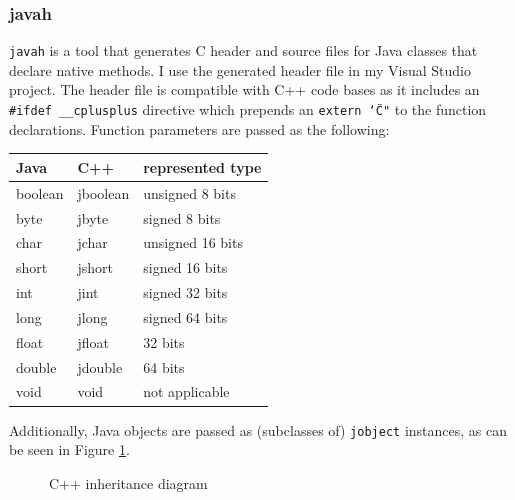 \documentclass[]{article}
\begin{document}
\subsubsection{javah}
\texttt{javah} is a tool that generates C header and source files for Java classes that declare native methods.
I use the generated header file in my Visual Studio project.
The header file is compatible with C++ code bases as it includes an \texttt{\#ifdef \_\_cplusplus} directive which prepends an \texttt{extern \char`\"C"} to the function declarations.
\cite{noauthor_jni_nodate} Function parameters are passed as the following:

\begin{center}
\begin{tabular}{|l|l|l|} \hline
  Java & C++ & represented type \\ \hline
  boolean & jboolean & unsigned 8 bits \\ 
  byte & jbyte & signed 8 bits \\ 
  char & jchar & unsigned 16 bits \\ 
  short & jshort & signed 16 bits \\ 
  int & jint & signed 32 bits \\ 
  long & jlong & signed 64 bits \\ 
  float & jfloat & 32 bits \\ 
  double & jdouble & 64 bits \\ 
  void & void & not applicable \\ \hline
\end{tabular}
\end{center}

Additionally, Java objects are passed as (subclasses of) \texttt{jobject} instances, as can be seen in Figure \ref{fig:jobject}.

\begin{figure}
  \begin{center}
  \end{center}
\caption{C++ inheritance diagram}
\label{fig:jobject}
\end{figure}
\end{document}
